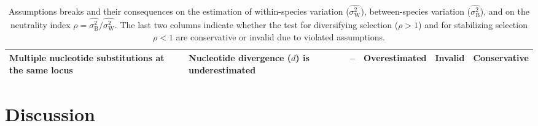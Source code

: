 \documentclass{article}
\newcommand{\RateBetween}{\sigma^2_{\mathrm{B}}}
\newcommand{\RateWhithin}{\sigma^2_{\mathrm{W}}}
\newcommand{\EstRateBetween}{\widehat{\RateBetween}}
\newcommand{\EstRateWhithin}{\widehat{\RateWhithin}}
\newcommand{\NI}{\rho}
\begin{document}
\begin{table}[t!]
\begin{adjustbox}{width = 1.0\textwidth}
\begin{tabular}{||l|l||c|c||c|c||}
            Multiple nucleotide substitutions at the same locus & Nucleotide divergence ($d$) is underestimated & -- & Overestimated & Invalid & Conservative  \\\hline \hline
        \end{tabular}
    \end{adjustbox}
    \caption{Assumptions breaks and their consequences on the estimation of within-species variation ($\EstRateWhithin$), between-species variation ($\EstRateBetween$), and on the neutrality index $\NI = \EstRateBetween/\EstRateWhithin$.
    The last two columns indicate whether the test for diversifying selection ($\NI > 1$) and for stabilizing selection $\NI < 1$ are conservative or invalid due to violated assumptions.
    }
    \label{table:assumptions}
\end{table}

\section*{Discussion}\label{sec:discussion}
\end{document}
